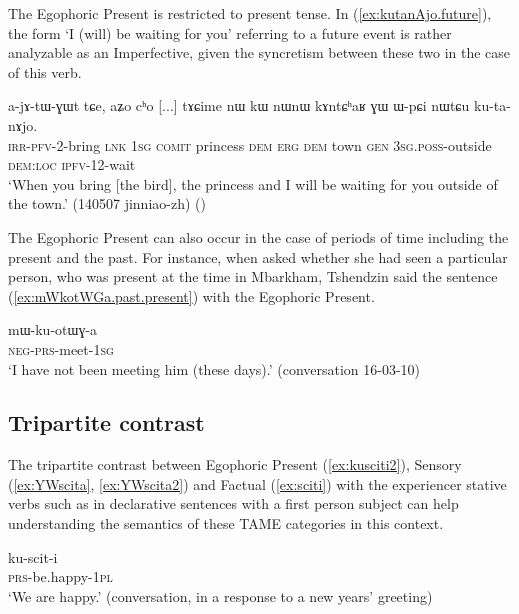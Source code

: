The Egophoric Present is restricted to present tense. In (\ref{ex:kutanAjo.future}), the form  `I (will) be waiting for you' referring to a future event is rather analyzable as an Imperfective, given the syncretism between these two in the case of this verb.

\begin{exe}
\ex \label{ex:kutanAjo.future}
\gll a-jɤ-tɯ-ɣɯt tɕe, aʑo cʰo [...] tɤɕime nɯ kɯ nɯnɯ kɤntɕʰaʁ ɣɯ ɯ-pɕi nɯtɕu ku-ta-nɤjo. \\
\textsc{irr}-\textsc{pfv}-2-bring \textsc{lnk} \textsc{1sg} \textsc{comit} { } princess \textsc{dem} \textsc{erg} \textsc{dem} town \textsc{gen} \textsc{3sg}.\textsc{poss}-outside \textsc{dem}:\textsc{loc} \textsc{ipfv}-1\fl{}2-wait \\
\glt `When you bring [the bird], the princess and I will be waiting for you outside of the town.' (140507 jinniao-zh)
()
\end{exe}

The Egophoric Present can also occur in the case of periods of time including the present and the past. For instance, when asked whether she had seen a particular person, who was present at the time in Mbarkham, Tshendzin said the sentence (\ref{ex:mWkotWGa.past.present}) with the Egophoric Present.

\begin{exe}
\ex \label{ex:mWkotWGa.past.present}
\gll mɯ-ku-otɯɣ-a \\
\textsc{neg}-\textsc{prs}-meet-\textsc{1sg} \\
\glt `I have not been meeting him (these days).' (conversation 16-03-10)
\end{exe} 

 \subsection{Tripartite contrast} \label{sec:egophoric.tripartite}
The tripartite contrast between Egophoric Present (\ref{ex:kusciti2}), Sensory (\ref{ex:YWscita}, \ref{ex:YWscita2}) and Factual (\ref{ex:sciti}) with the experiencer stative verbs such as  in  declarative sentences with a first person subject can help understanding the semantics of these TAME categories in this context.


\begin{exe}
\ex \label{ex:kusciti2}
\gll ku-scit-i \\
\textsc{prs}-be.happy-\textsc{1pl} \\
\glt `We are happy.' (conversation, in a response to a new years' greeting)
\end{exe}

